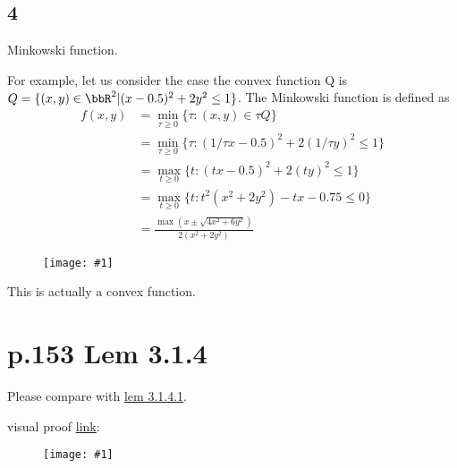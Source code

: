 \documentclass[a4paper, 14pt, dvipdfmx]{extarticle}
\newcommand{\IMG}[2]{
    \begin{figure}[H]
        \centering
        \texttt{[image: \#1]}
    \end{figure}
}
\begin{document}

\subsection*{4}

Minkowski function.

For example, let us consider the case the convex function Q is $Q = \{ (x,y) \in \bbR^2 | (x-0.5)^2 + 2y^2 \leq 1 \}$.
The Minkowski function is defined as
\begin{align*}
    f(x,y) & = \min_{\tau \geq 0} \{ \tau : (x,y) \in \tau Q \}                          \\
           & = \min_{\tau \geq 0} \{ \tau : (1/\tau x - 0.5)^2 + 2(1/\tau y)^2 \leq 1 \} \\
           & = \max_{t \geq 0} \{ t : (tx-0.5)^2 + 2(ty)^2 \leq 1 \}                     \\
           & = \max_{t \geq 0} \{ t : t^2(x^2+2y^2) - tx - 0.75 \leq 0 \}                \\
           & = \frac{\max(x \pm \sqrt{4x^2+6y^2})}{2(x^2+2y^2)}
\end{align*}

\IMG{Minkowski.pdf}{0.8}

This is actually a convex function.

\section*{p.153 Lem 3.1.4}\label{lem:3.1.4}

Please compare with \href{lem:3.1.4.1}{lem 3.1.4.1}.

visual proof \href{https://math.stackexchange.com/questions/258511/prove-that-every-convex-function-is-continuous}{link}:
\IMG{stackExchange.png}{0.8}
\end{document}
